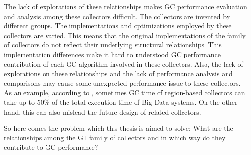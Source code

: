The lack of explorations of these relationships makes GC performance evaluation
and analysis among these collectors difficult.
The collectors are invented by different groups.
The implementations and optimizations employed by these collectors are varied.
This means that the original implementations of the family of collectors do not reflect
their underlying structural relationships.
This implementation differences make it hard to understood GC performance contribution of each
GC algorithm involved in these collectors.
Also, the lack of explorations on these relationships and the lack of
performance analysis and comparisons may cause some unexpected performance issue to these collectors.
As an example, according to \cite{nguyen2015speculative}, sometimes GC time of region-based collectors
can take up to 50\% of the total execution time of Big Data systems.
On the other hand, this can also mislead the future design of related collectors.

So here comes the problem which this thesis is aimed to solve: What are the relationships
among the G1 family of collectors and in which way do they contribute to GC performance?





